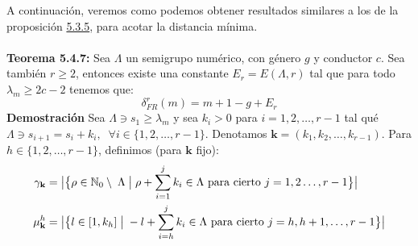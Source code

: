 \documentclass[11pt,spanish]{book}
\newcommand{\fr}{\delta_{FR}^{r}(m)}
\newcommand{\la}{\lambda}
\begin{document}
A continuación, veremos como podemos obtener resultados similares a los de la proposición \hyperlink{prop5.4.6}{5.3.5}, para acotar la distancia mínima.\\
\\ \hypertarget{prop5.4.7}{\textbf{Teorema 5.4.7:}} Sea $\Lambda$ un semigrupo numérico, con género $g$ y conductor $c$. Sea también $r\geq 2$, entonces existe una constante $E_r = E(\Lambda,r)$ tal que para todo $\lambda_m\geq 2c-2$ tenemos que:
$$\fr = m+1-g+E_r$$
\textbf{Demostración}
Sea $\Lambda\ni s_1\geq \la_m$ y sea $k_i>0$ para $i=1,2,\ldots, r-1$ tal qué $\Lambda\ni s_{i+1}=s_i+k_i,\;\;\forall i\in\{1,2,\ldots,r-1\}$. Denotamos $\mathbf{k}=(k_1,k_2,\ldots,k_{r-1})$. Para $h\in\{1,2,\ldots,r-1\}$, definimos (para $\mathbf{k}$ fijo):
\begin{align*}
    \gamma_{\mathbf{k}} &= \big{|}\big{\{} \rho\in\mathbb{N}_0\setminus\; \Lambda \;\big{|}\;\rho+\sum_{i=1}^{j}k_i\in \Lambda\text{ para cierto  } j=1,2\ldots ,r-1   \big{\}}\big{|}\\
    \mu_{\mathbf{k}}^{h} &= \big{|}\big{\{} l\in [1,k_h]\;\big{|}\; -l+\sum_{i=h}^{j} k_i\in \Lambda\text{ para cierto  } j=h,h+1,\ldots ,r-1\big{\}}\big{|}
\end{align*}
\end{document}
